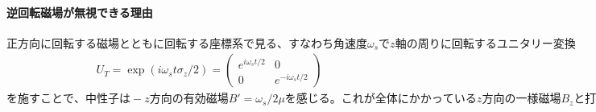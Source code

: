 \paragraph{逆回転磁場が無視できる理由}
$正方向に回転する磁場とともに回転する座標系で見る、すなわち角速度\omega_{s}でz軸の周りに回転するユニタリー変換$
\begin{align}
U_{T}=\exp(i\omega_{s}t{\sigma}_{z}/2)=
\begin{pmatrix}
e^{i\omega_{s}t/2} &0 \\
0 &e^{-i\omega_{s}t/2}
\end{pmatrix}
\end{align}
$を施すことで、中性子は-z方向の有効磁場B'=\omega_{s}/2{\mu}を感じる。これが全体にかかっているz方向の一様磁場B_{z}と打ち消しあって横方向の磁場だけが残り、スピンがフリップした。一方、逆回転磁場について、磁場とともに回転する座標系では、中性子は+z方向の有効磁場B'=\omega_{s}/2{\mu}を感じる。これは全体にかかっているz方向の一様磁場B_{z}と向きが同じであるから、中性子はB_{z}+B'の磁場を+z方向に感じる。いま、スピン方向を一定に保とうとするz方向の磁場B_{z}+B'がスピンをフリップさせようとするz軸に垂直な磁場B_{r}よりも十分大きいので、逆回転磁場によるスピンのフリップの効果は無視できる。$


